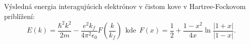 \documentclass[
	11pt, %
]{beamer}
\begin{document}
\begin{frame}
Výsledná energia interagujúcich elektrónov v čistom kove v Hartree-Fockovom priblížení:
\begin{equation}
\label{eq:fock_erg}
E(k)=\frac{\hbar^2 k^2}{2m}- \frac{e^2 k_f}{4\pi^2\epsilon_0} F(\frac{k}{k_f})\ \ \text{kde}\ \ F(x)=\frac{1}{2}+\frac{1-x^2}{4x}\ln{\frac{|1+x|}{|1-x|}} \text{.}
\end{equation}

\begin{figure}%
    \centering

\end{figure}
\end{frame}
\end{document}
